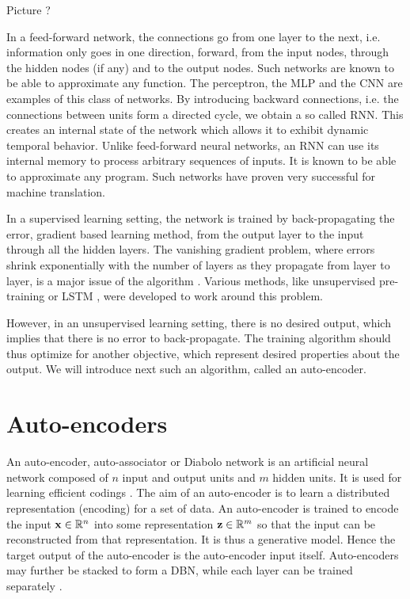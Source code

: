 {\color{red} Picture ?}

In a feed-forward network, the connections go from one layer to the next, i.e. information only goes in one direction, forward, from the input nodes, through the hidden nodes (if any) and to the output nodes. Such networks are known to be able to approximate any function. The perceptron, the \gls{MLP} and the \gls{CNN} are examples of this class of networks.
By introducing backward connections, i.e. the connections between units form a directed cycle, we obtain a so called \gls{RNN}. This creates an internal state of the network which allows it to exhibit dynamic temporal behavior. Unlike feed-forward neural networks, an \gls{RNN} can use its internal memory to process arbitrary sequences of inputs. It is known to be able to approximate any program. Such networks have proven very successful for machine translation.

In a supervised learning setting, the network is trained by back-propagating the error, gradient based learning method, from the output layer to the input through all the hidden layers.
The vanishing gradient problem, where errors shrink exponentially with the number of layers as they propagate from layer to layer, is a major issue of the algorithm \cite{hochreiter2001vanishingGradient}. Various methods, like unsupervised pre-training or \gls{LSTM} \cite{hochreiter1997LSTM}, were developed to work around this problem.

However, in an unsupervised learning setting, there is no desired output, which implies that there is no error to back-propagate. The training algorithm should thus optimize for another objective, which represent desired properties about the output. We will introduce next such an algorithm, called an auto-encoder.

\section{Auto-encoders} \label{sec:auto_encoders}

An auto-encoder, auto-associator or Diabolo network is an artificial neural network composed of $n$ input and output units and $m$ hidden units. It is used for learning efficient codings \cite{bourlard1988autoencoder, hinton1994autoencoder}. The aim of an auto-encoder is to learn a distributed representation (encoding) for a set of data. An auto-encoder is trained to encode the input $\mathbf{x} \in \mathbb{R}^n$ into some representation $\mathbf{z} \in \mathbb{R}^m$ so that the input can be reconstructed from that representation. It is thus a generative model. Hence the target output of the auto-encoder is the auto-encoder input itself. Auto-encoders may further be stacked to form a \gls{DBN}, while each layer can be trained separately \cite{bengio2007DBN, ranzato2007stackedSparseAutoencoders}.

